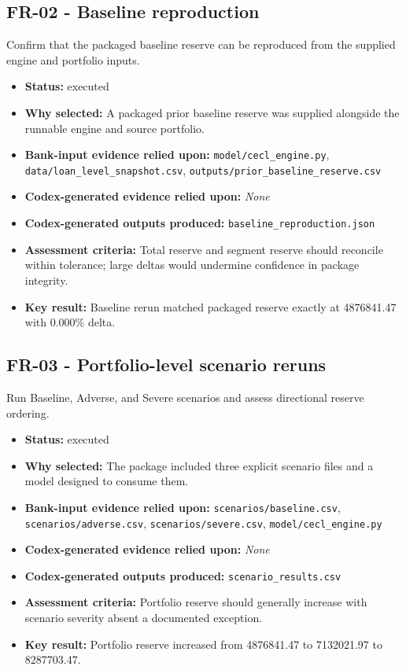 \documentclass[11pt]{article}
\begin{document}
\subsection*{FR-02 - Baseline reproduction}
Confirm that the packaged baseline reserve can be reproduced from the supplied engine and portfolio inputs.
\begin{itemize}
\item \textbf{Status:} executed
\item \textbf{Why selected:} A packaged prior baseline reserve was supplied alongside the runnable engine and source portfolio.
\item \textbf{Bank-input evidence relied upon:} \texttt{model/cecl\_engine.py}, \texttt{data/loan\_level\_snapshot.csv}, \texttt{outputs/prior\_baseline\_reserve.csv}
\item \textbf{Codex-generated evidence relied upon:} \textit{None}
\item \textbf{Codex-generated outputs produced:} \texttt{baseline\_reproduction.json}
\item \textbf{Assessment criteria:} Total reserve and segment reserve should reconcile within tolerance; large deltas would undermine confidence in package integrity.
\item \textbf{Key result:} Baseline rerun matched packaged reserve exactly at 4876841.47 with 0.000\% delta.
\end{itemize}
\subsection*{FR-03 - Portfolio-level scenario reruns}
Run Baseline, Adverse, and Severe scenarios and assess directional reserve ordering.
\begin{itemize}
\item \textbf{Status:} executed
\item \textbf{Why selected:} The package included three explicit scenario files and a model designed to consume them.
\item \textbf{Bank-input evidence relied upon:} \texttt{scenarios/baseline.csv}, \texttt{scenarios/adverse.csv}, \texttt{scenarios/severe.csv}, \texttt{model/cecl\_engine.py}
\item \textbf{Codex-generated evidence relied upon:} \textit{None}
\item \textbf{Codex-generated outputs produced:} \texttt{scenario\_results.csv}
\item \textbf{Assessment criteria:} Portfolio reserve should generally increase with scenario severity absent a documented exception.
\item \textbf{Key result:} Portfolio reserve increased from 4876841.47 to 7132021.97 to 8287703.47.
\end{itemize}
\end{document}
